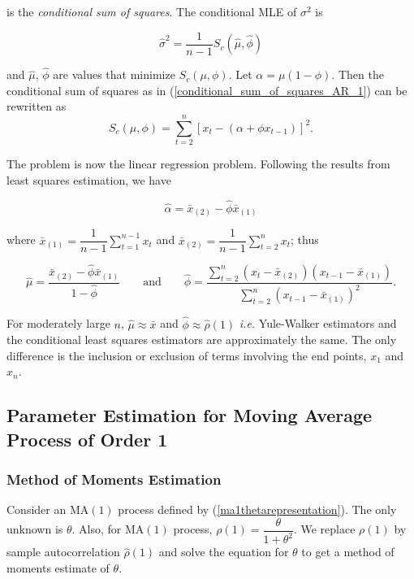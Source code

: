 \documentclass[11pt, a4paper]{article}
\numberwithin{equation}{section}
\theoremstyle{definition}
\begin{document}
is the \textit{conditional sum of squares}. The conditional MLE of $\sigma^2$ is

\begin{equation}
\hat{\sigma}^2 = \dfrac{1}{n-1} S_c(\hat{\mu}, \hat{\phi})
\end{equation}

and $\hat{\mu}$, $\hat{\phi}$ are values that minimize $S_c(\mu, \phi)$. Let $\alpha = \mu( 1 - \phi )$. Then the conditional sum of squares as in (\ref{conditional_sum_of_squares_AR_1}) can be rewritten as
\begin{equation}
S_c(\mu, \phi) = \sum \limits_{t = 2}^{n} \left[ x_t - (\alpha + \phi x_{t-1}) \right]^2.
\end{equation}

The problem is now the linear regression problem. Following the results from least squares estimation, we have

\begin{equation}
\hat{\alpha} = \bar{x}_{(2)} - \hat{\phi} \bar{x}_{(1)}
\end{equation}

where $\bar{x}_{(1)} = \dfrac{1}{n-1} \sum \limits_{t = 1}^{n-1} x_t$ and $\bar{x}_{(2)} = \dfrac{1}{n-1} \sum \limits_{t = 2}^{n} x_t$; thus

\begin{equation}
\hat{\mu} = \dfrac{\bar{x}_{(2)} - \hat{\phi} \bar{x}_{(1)}}{1 - \hat{\phi}} \qquad \text{and} \qquad \hat{\phi} = \dfrac{\sum \limits_{t = 2}^{n} (x_t - \bar{x}_{(2)}) (x_{t-1} - \bar{x}_{(1)})}{\sum \limits_{t = 2}^{n} (x_{t-1} - \bar{x}_{(1)})^2}.
\end{equation}

For moderately large $n$, $\hat{\mu} \approx \bar{x}$ and $\hat{\phi} \approx \hat{\rho}(1)$ \textit{i.e.} Yule-Walker estimators and the conditional least squares estimators are approximately the same. The only difference is the inclusion or exclusion of terms involving the end points, $x_1$ and $x_n$.

\subsection{Parameter Estimation for Moving Average Process of Order 1}

\subsubsection{Method of Moments Estimation}

Consider an MA$(1)$ process defined by (\ref{ma1thetarepresentation}). The only unknown is $\theta$. Also, for MA$(1)$ process, $\rho(1) = \dfrac{\theta}{1 + \theta^2}$. We replace $\rho(1)$ by sample autocorrelation $\hat{\rho}(1)$ and solve the equation for $\theta$ to get a method of moments estimate of $\theta$.
\end{document}
